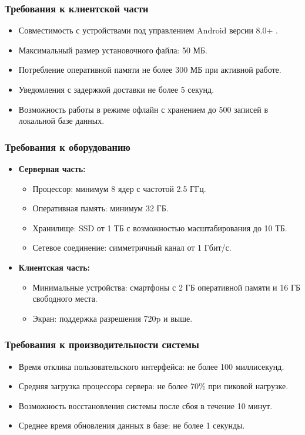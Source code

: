 \subsubsection*{Требования к клиентской части}
\begin{itemize}
	\item Совместимость с устройствами под управлением Android версии 8.0+ .
	\item Максимальный размер установочного файла: 50 МБ.
	\item Потребление оперативной памяти не более 300 МБ при активной работе.
	\item Уведомления с задержкой доставки не более 5 секунд.
	\item Возможность работы в режиме офлайн с хранением до 500 записей в локальной базе данных.
\end{itemize}

\subsubsection*{Требования к оборудованию}
\begin{itemize}
	\item \textbf{Серверная часть:}
	\begin{itemize}
		\item Процессор: минимум 8 ядер с частотой 2.5 ГГц.
		\item Оперативная память: минимум 32 ГБ.
		\item Хранилище: SSD от 1 ТБ с возможностью масштабирования до 10 ТБ.
		\item Сетевое соединение: симметричный канал от 1 Гбит/с.
	\end{itemize}
	\item \textbf{Клиентская часть:}
	\begin{itemize}
		\item Минимальные устройства: смартфоны с 2 ГБ оперативной памяти и 16 ГБ свободного места.
		\item Экран: поддержка разрешения 720p и выше.
	\end{itemize}
\end{itemize}

\subsubsection*{Требования к производительности системы}
\begin{itemize}
	\item Время отклика пользовательского интерфейса: не более 100 миллисекунд.
	\item Средняя загрузка процессора сервера: не более 70\% при пиковой нагрузке.
	\item Возможность восстановления системы после сбоя в течение 10 минут.
	\item Среднее время обновления данных в базе: не более 1 секунды.
\end{itemize}

